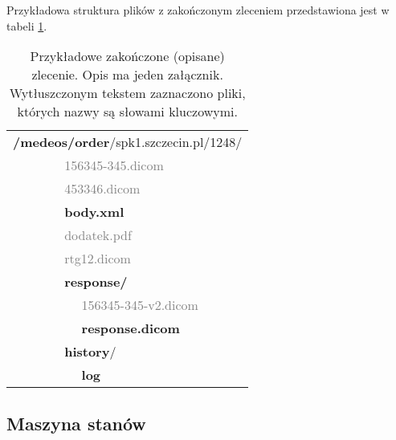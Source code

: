 \documentclass[a4paper]{article}
\begin{document}
Przykładowa struktura plików z zakończonym zleceniem przedstawiona jest w tabeli
\ref{tab:dir}.

\begin{table}
\begin{center}
\begin{tabular}{ p{2cm} p{.2cm} p{.2cm} p{.2cm} p{4cm} }
  \multicolumn{5}{l}{\textbf{/medeos/order}/spk1.szczecin.pl/1248/} \\
   & & & \multicolumn{2}{l}{\textcolor{gray}{156345-345.dicom}} \\
   & & & \multicolumn{2}{l}{\textcolor{gray}{453346.dicom}} \\
   & & & \multicolumn{2}{l}{\textbf{body.xml}} \\
   & & & \multicolumn{2}{l}{\textcolor{gray}{dodatek.pdf}} \\
   & & & \multicolumn{2}{l}{\textcolor{gray}{rtg12.dicom}} \\
   & & & \multicolumn{2}{l}{\textbf{response/}} \\
   & & & & \textcolor{gray}{156345-345-v2.dicom} \\
   & & & & \textbf{response.dicom} \\
   & & & \multicolumn{2}{l}{\textbf{history}/} \\
   & & & & \textbf{log} \\
\end{tabular}
\caption[Przykładowe zakończone zlecenie]{Przykładowe zakończone (opisane)
zlecenie. Opis ma jeden załącznik. Wytłuszczonym tekstem zaznaczono pliki, których nazwy są słowami kluczowymi.}
\label{tab:dir}
\end{center}
\end{table}

\subsection{Maszyna stanów}
\end{document}
